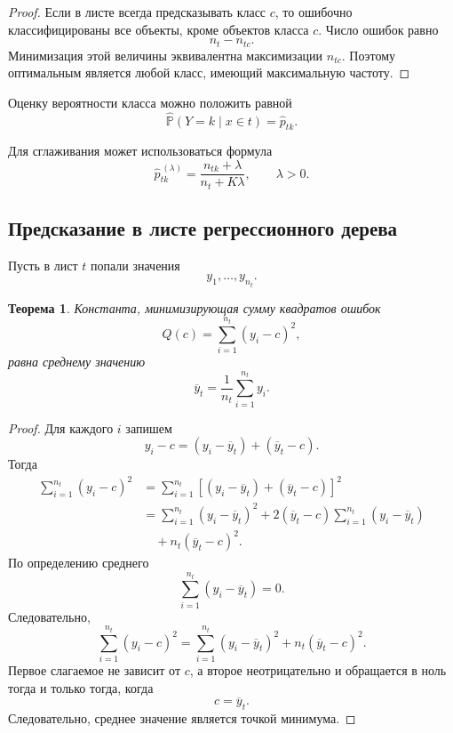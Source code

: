 \documentclass[12pt,a4paper]{article}
\theoremstyle{plain}
\newtheorem{theorem}{Теорема}[section]
\theoremstyle{definition}
\theoremstyle{remark}
\newcommand{\Pp}{\mathbb{P}}
\begin{document}
\begin{proof}
Если в листе всегда предсказывать класс $c$, то ошибочно
классифицированы все объекты, кроме объектов класса $c$. Число ошибок
равно
\[
    n_t-n_{tc}.
\]
Минимизация этой величины эквивалентна максимизации $n_{tc}$. Поэтому
оптимальным является любой класс, имеющий максимальную частоту.
\end{proof}

Оценку вероятности класса можно положить равной
\[
    \widehat{\Pp}(Y=k\mid x\in t)
    =
    \widehat{p}_{tk}.
\]

Для сглаживания может использоваться формула
\[
    \widehat{p}_{tk}^{\,(\lambda)}
    =
    \frac{n_{tk}+\lambda}
         {n_t+K\lambda},
    \qquad \lambda>0.
\]

\subsection{Предсказание в листе регрессионного дерева}

Пусть в лист $t$ попали значения
\[
    y_1,\ldots,y_{n_t}.
\]

\begin{theorem}
Константа, минимизирующая сумму квадратов ошибок
\[
    Q(c)
    =
    \sum_{i=1}^{n_t}(y_i-c)^2,
\]
равна среднему значению
\[
    \overline{y}_t
    =
    \frac{1}{n_t}\sum_{i=1}^{n_t}y_i.
\]
\end{theorem}

\begin{proof}
Для каждого $i$ запишем
\[
    y_i-c
    =
    (y_i-\overline{y}_t)+(\overline{y}_t-c).
\]
Тогда
\[
\begin{aligned}
    \sum_{i=1}^{n_t}(y_i-c)^2
    &=
    \sum_{i=1}^{n_t}
    \left[
        (y_i-\overline{y}_t)
        +
        (\overline{y}_t-c)
    \right]^2
    \\
    &=
    \sum_{i=1}^{n_t}(y_i-\overline{y}_t)^2
    +
    2(\overline{y}_t-c)
    \sum_{i=1}^{n_t}(y_i-\overline{y}_t)
    \\
    &\quad+
    n_t(\overline{y}_t-c)^2.
\end{aligned}
\]
По определению среднего
\[
    \sum_{i=1}^{n_t}(y_i-\overline{y}_t)=0.
\]
Следовательно,
\[
    \sum_{i=1}^{n_t}(y_i-c)^2
    =
    \sum_{i=1}^{n_t}(y_i-\overline{y}_t)^2
    +
    n_t(\overline{y}_t-c)^2.
\]
Первое слагаемое не зависит от $c$, а второе неотрицательно и обращается
в ноль тогда и только тогда, когда
\[
    c=\overline{y}_t.
\]
Следовательно, среднее значение является точкой минимума.
\end{proof}
\end{document}
